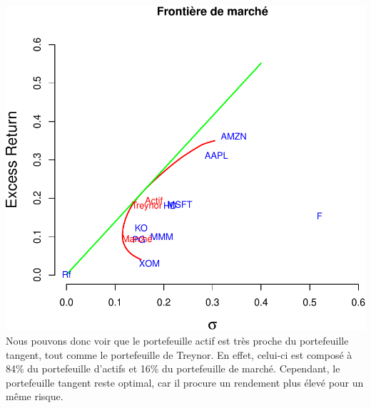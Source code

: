 \documentclass[
]{article}
\newenvironment{Shaded}{\begin{snugshade}}{\end{snugshade}}
\newcommand{\AttributeTok}[1]{\textcolor[rgb]{0.77,0.63,0.00}{#1}}
\newcommand{\ControlFlowTok}[1]{\textcolor[rgb]{0.13,0.29,0.53}{\textbf{#1}}}
\newcommand{\DecValTok}[1]{\textcolor[rgb]{0.00,0.00,0.81}{#1}}
\newcommand{\FloatTok}[1]{\textcolor[rgb]{0.00,0.00,0.81}{#1}}
\newcommand{\FunctionTok}[1]{\textcolor[rgb]{0.00,0.00,0.00}{#1}}
\newcommand{\NormalTok}[1]{#1}
\newcommand{\OtherTok}[1]{\textcolor[rgb]{0.56,0.35,0.01}{#1}}
\newcommand{\SpecialCharTok}[1]{\textcolor[rgb]{0.00,0.00,0.00}{#1}}
\newcommand{\StringTok}[1]{\textcolor[rgb]{0.31,0.60,0.02}{#1}}
\begin{document}
\begin{Shaded}
\end{Shaded}

\includegraphics{TP-Treynor_files/figure-latex/unnamed-chunk-15-1.pdf}
Nous pouvons donc voir que le portefeuille actif est très proche du
portefeuille tangent, tout comme le portefeuille de Treynor. En effet,
celui-ci est composé à 84\% du portefeuille d'actifs et 16\% du
portefeuille de marché. Cependant, le portefeuille tangent reste
optimal, car il procure un rendement plus élevé pour un même risque.
\end{document}
